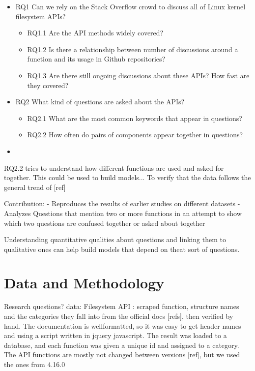 \begin{itemize}
  \item
  RQ1 Can we rely on the Stack Overflow crowd to discuss all of Linux kernel filesystem APIs?
  \begin{itemize}
    \item
    RQ1.1 Are the API methods widely covered?
    \item
    RQ1.2 Is there a relationship between number of discussions around a function and its usage in Github repositories?
    \item
    RQ1.3 Are there still ongoing discussions about these APIs? How fast are they covered?
  \end{itemize}
  \item
  RQ2 What kind of questions are asked about the APIs?
  \begin{itemize}
    \item
    RQ2.1 What are the most common keywords that appear in questions?
    \item
    RQ2.2 How often do pairs of components appear together in questions?
  \end{itemize}
  \item
\end{itemize}
RQ2.2 tries to understand how different functions are used and asked for together. This could be used to build models...
To verify that the data follows the general trend of [ref]

Contribution:
- Reproduces the results of earlier studies on different datasets
- Analyzes Questions that mention two or more functions in an attempt to show which two questions are confused together or asked about together

Understanding quantitative qualities about questions and linking them to qualitative ones can help build models that depend on theat sort of questions.


\section{Data and Methodology}
Research questions?
data:
Filesystem API : scraped function, structure names and the categories they fall into from the official docs [refs], then verified by hand. The documentation is wellformatted, so it was easy to get header names and using a script written in jquery javascript. The result was loaded to a database, and each function was given a unique id and assigned to a category.
The API functions are mostly not changed between versions [ref], but we used the ones from 4.16.0

